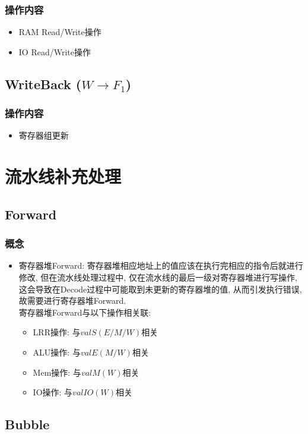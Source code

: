 \documentclass[10pt]{book}
\begin{document}
\subsubsection{操作内容}
\begin{itemize}
  \item RAM Read/Write操作
  \item IO Read/Write操作
\end{itemize}

\subsection{WriteBack ($W\rightarrow F_{1}$)}
\subsubsection{操作内容}
\begin{itemize}
  \item 寄存器组更新
\end{itemize}

\section{流水线补充处理}
\subsection{Forward}
\subsubsection{概念}
\begin{itemize}
  \item 寄存器堆Forward: 寄存器堆相应地址上的值应该在执行完相应的指令后就进行修改, 但在流水线处理过程中, 仅在流水线的最后一级对寄存器堆进行写操作, 这会导致在Decode过程中可能取到未更新的寄存器堆的值, 从而引发执行错误, 故需要进行寄存器堆Forward.\\
  寄存器堆Forward与以下操作相关联:
  \begin{itemize}
    \item LRR操作: 与$valS(E/M/W)$相关
    \item ALU操作: 与$valE(M/W)$相关
    \item Mem操作: 与$valM(W)$相关
    \item IO操作: 与$valIO(W)$相关
  \end{itemize}
\end{itemize}
  
\subsection{Bubble}
\end{document}
